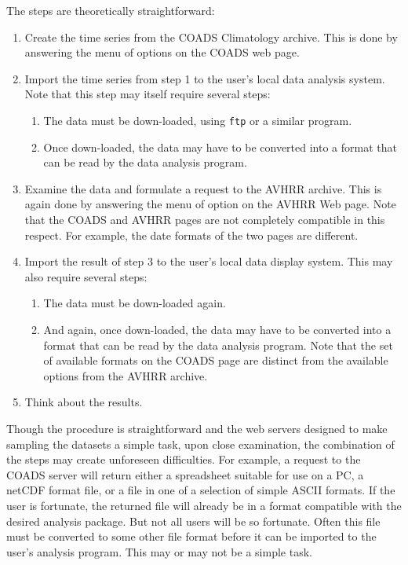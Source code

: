 The steps are theoretically straightforward:

\begin{enumerate}

\item Create the time series from the COADS Climatology archive. This
is done by answering the menu of options on the COADS web page.

\item Import the time series from step 1 to the user's local data
analysis system.  Note that this step may itself require several steps:

\begin{enumerate}
\item The data must be down-loaded, using {\tt ftp} or a similar
program.

\item Once down-loaded, the data may have to be converted into a format
that can be read by the data analysis program.
\end{enumerate}

\item Examine the data and formulate a request to the AVHRR archive. This
is again done by answering the menu of option on the AVHRR Web page.  Note
that the COADS and AVHRR pages are not completely compatible in this respect.
For example, the date formats of the two pages are different.

\item Import the result of step 3 to the user's local data display system.
This may also require several steps:

\begin{enumerate}
\item The data must be down-loaded again.

\item And again, once down-loaded, the data may have to be converted
into a format that can be read by the data analysis program.  Note that
the set of available formats on the COADS page are distinct from the available
options from the AVHRR archive.
\end{enumerate}
\item Think about the results.

\end{enumerate}

Though the procedure is straightforward and the web servers designed
to make sampling the datasets a simple task, upon close examination,
the combination of the steps may create unforeseen difficulties. For
example, a request to the COADS server will return either a spreadsheet 
suitable for use on a PC, a netCDF format file, or a file in one
of a selection of simple ASCII formats.
If the user is fortunate, the returned file will already be in a
format compatible with the desired analysis package. But not all users
will be so fortunate.  Often this file must be converted to some
other file format before it can be imported to the user's analysis
program. This may or may not be a simple task.

